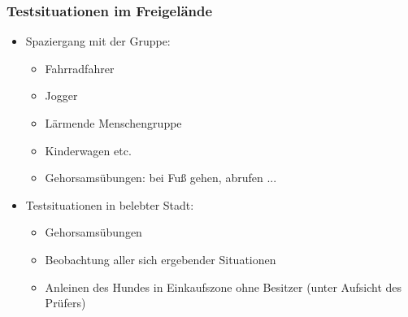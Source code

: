         \subsubsection{Testsituationen im Freigelände}
            \begin{itemize}
                \item Spaziergang mit der Gruppe:
                \begin{itemize}
                    \item Fahrradfahrer
                    \item Jogger
                    \item Lärmende Menschengruppe
                    \item Kinderwagen etc.
                    \item Gehorsamsübungen: bei Fuß gehen, abrufen ...
                \end{itemize}
                \item Testsituationen in belebter Stadt:
                \begin{itemize}
                    \item Gehorsamsübungen
                    \item Beobachtung aller sich ergebender Situationen
                    \item Anleinen des Hundes in Einkaufszone ohne Besitzer (unter Aufsicht des Prüfers)
                \end{itemize}
            \end{itemize}
